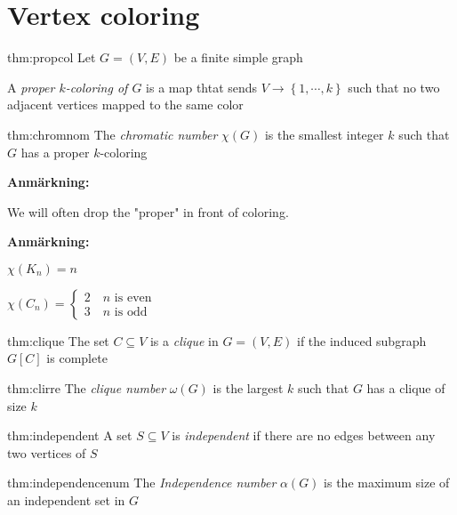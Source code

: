 \section{Vertex coloring}\par
\begin{theo}{thm:propcol}
  Let $G = (V,E)$ be a finite simple graph
  \par\bigskip
\noindent A \textit{proper $k$-coloring of $G$} is a map thtat sends $V\to\left\{1,\cdots,k\right\}$ such that no two adjacent vertices mapped to the same color
\end{theo}
\par\bigskip
\begin{theo}{thm:chromnom}
  The \textit{chromatic number} $\chi(G)$ is the smallest integer $k$ such that $G$ has a proper $k$-coloring
\end{theo}
\par\bigskip
\noindent\textbf{Anmärkning:}\par
\noindent We will often drop the "proper" in front of coloring.
\par\bigskip
\noindent\textbf{Anmärkning:}\par
\noindent $\chi(K_n) = n$\par
\noindent $\chi(C_n) = \begin{cases}2\quad\text{$n$ is even}\\3\quad\text{$n$ is odd}\end{cases}$
\par\bigskip
\begin{theo}[Clique]{thm:clique}
  The set $C\subseteq V$ is a \textit{clique}  in $G = (V,E)$ if the induced subgraph $G[C]$ is complete
\end{theo}
\par\bigskip
\begin{theo}{thm:clirre}
  The \textit{clique number} $\omega(G)$ is the largest $k$ such that $G$ has a clique of size $k$
\end{theo}
\par\bigskip
\begin{theo}[Independent]{thm:independent}
  A set $S\subseteq V$ is \textit{independent} if there are no edges between any two vertices of $S$
\end{theo}
\par\bigskip
\begin{theo}{thm:independencenum}
  The \textit{Independence number} $\alpha(G)$ is the maximum size of an independent set in $G$
\end{theo}
